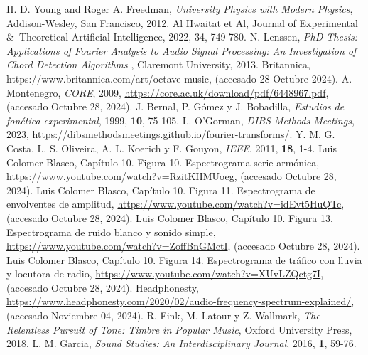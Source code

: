 \documentclass[12pt, letterpaper]{article}
\begin{document}
\begin{thebibliography}{9}
  H. D. Young and Roger A. Freedman, \emph{University Physics with Modern Physics}, 
  Addison-Wesley, San Francisco, 2012.
  Al Hwaitat et Al, Journal of Experimental \&\ Theoretical Artificial Intelligence,
  2022, 34, 749-780.
  N. Lenssen, \emph{PhD Thesis: Applications of Fourier Analysis to Audio Signal Processing: An Investigation of Chord Detection Algorithms
  }, Claremont University, 2013.
  Britannica, https://www.britannica.com/art/octave-music, (accesado 28 Octubre 2024).
  A. Montenegro, \textit{CORE}, 2009, \url{https://core.ac.uk/download/pdf/6448967.pdf}, (accesado Octubre 28, 2024).
  J. Bernal, P. Gómez y J. Bobadilla, \textit{Estudios de fonética experimental}, 1999, \textbf{10}, 75-105.
  L. O'Gorman, \textit{DIBS Methods Meetings}, 2023, \url{https://dibsmethodsmeetings.github.io/fourier-transforms/}.
  Y. M. G. Costa, L. S. Oliveira, A. L. Koerich y F. Gouyon, \textit{IEEE}, 2011,
  \textbf{18}, 1-4.
  Luis Colomer Blasco, Capítulo 10. Figura 10. Espectrograma serie armónica,
  \url{https://www.youtube.com/watch?v=RzitKHMUoeg}, (accesado Octubre 28, 2024).
  Luis Colomer Blasco, Capítulo 10. Figura 11. Espectrograma de envolventes de amplitud,
  \url{https://www.youtube.com/watch?v=idEvt5HuQTc}, (accesado Octubre 28, 2024).
  Luis Colomer Blasco, Capítulo 10. Figura 13. Espectrograma de ruido blanco y sonido simple,
  \url{https://www.youtube.com/watch?v=ZoffBnGMctI}, (accesado Octubre 28, 2024).
  Luis Colomer Blasco, Capítulo 10. Figura 14. Espectrograma de tráfico con lluvia y locutora de radio,
  \url{https://www.youtube.com/watch?v=XUvLZQctg7I}, (accesado Octubre 28, 2024).
  Headphonesty, \url{https://www.headphonesty.com/2020/02/audio-frequency-spectrum-explained/},
  (accesado Noviembre 04, 2024).
  R. Fink, M. Latour y Z. Wallmark, \textit{The Relentless Pursuit of Tone: Timbre in Popular Music},
  Oxford University Press, 2018.
  L. M. Garcia, \textit{Sound Studies: An Interdisciplinary Journal}, 2016, \textbf{1}, 59-76.
\end{thebibliography}
\end{document}
